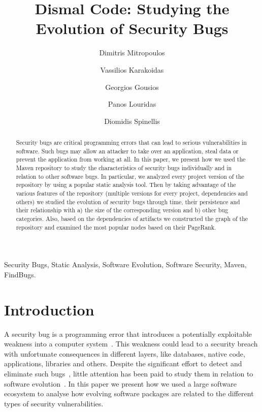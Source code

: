 \documentclass[conference]{llncs}
\begin{document}
\title{Dismal Code: Studying the Evolution of Security Bugs}

\author{Dimitris Mitropoulos \and Vassilios Karakoidas \and Georgios Gousios \and Panos Louridas \and Diomidis Spinellis }

\maketitle

\begin{abstract}
Security bugs are critical programming errors that can lead to serious
vulnerabilities in software. Such bugs may allow an attacker to take over
an application, steal data or prevent the application from working at all.
In this paper, we present how we used the Maven repository to study the
characteristics of security bugs individually and in relation to other software
bugs. In particular, we analyzed every project version of the repository by using a
popular static analysis tool. Then by taking advantage of the various features of
the repository (multiple versions for every project, dependencies and others) we studied
the evolution of security bugs through time, their persistence and their relationship with a) the
size of the corresponding version and b) other bug categories. Also, based on the
dependencies of artifacts we constructed the graph of the repository and
examined the most popular nodes based on their PageRank. 
\end{abstract}

\begin{keywords}
Security Bugs, Static Analysis, Software Evolution, Software
Security, Maven, FindBugs.
\end{keywords}

\section{Introduction}

A security bug is a programming error that introduces a potentially
exploitable weakness into a computer system~\cite{SSL12}\cite{TJBD11}. This weakness could lead to a
security breach with unfortunate consequences in different layers, like databases,
native code, applications, libraries and others. Despite the significant
effort to detect and eliminate such bugs~\cite{SZ12}, little attention has been paid to
study them in relation to software evolution~\cite{L96}\cite{LRWPT97}\cite{IB06}\cite{RGMA06}.
In this paper we present how we used a large software ecosystem to analyse
how evolving software packages are related to the different types of security
vulnerabilities.
\end{document}
